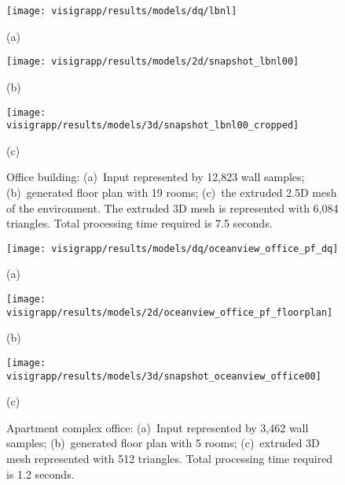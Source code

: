 \documentclass[12pt,onecolumn,oneside]{book}
\begin{document}
\begin{figure}
	\centering
	
	\begin{minipage}[b]{0.95\linewidth}
	\centerline{\texttt{[image: visigrapp/results/models/dq/lbnl]}}
	\centerline{(a)}
	\end{minipage}
	\hfill
	\begin{minipage}[b]{0.95\linewidth}
	\centerline{\texttt{[image: visigrapp/results/models/2d/snapshot\_lbnl00]}}
	\centerline{(b)}
	\end{minipage}
	\begin{minipage}[b]{0.95\linewidth}
	\centerline{\texttt{[image: visigrapp/results/models/3d/snapshot\_lbnl00\_cropped]}}
	\centerline{(c)}
	\end{minipage}

	\caption[Generated floor plan of an office building.]{Office building: (a)~Input represented by 12,823 wall samples; (b)~generated floor plan with 19 rooms; (c)~the extruded 2.5D mesh of the environment. The extruded 3D mesh is represented with 6,084 triangles.  Total processing time required is 7.5 seconds.}
	\label{fig:visigrapp_results_a}
\end{figure}

\begin{figure}[t]
	\centering
	
	\begin{minipage}[b]{0.50\linewidth}
	\centerline{\texttt{[image: visigrapp/results/models/dq/oceanview\_office\_pf\_dq]}}
	\centerline{(a)}
	\end{minipage}
	\hfill
	\begin{minipage}[b]{0.45\linewidth}
	\centerline{\texttt{[image: visigrapp/results/models/2d/oceanview\_office\_pf\_floorplan]}}
	\centerline{(b)}
	\end{minipage}
	\begin{minipage}[b]{0.95\linewidth}
	\centerline{\texttt{[image: visigrapp/results/models/3d/snapshot\_oceanview\_office00]}}
	\centerline{(c)}
	\end{minipage}

	\caption[Floor plan of an apartment complex office.]{Apartment complex office: (a)~Input represented by 3,462 wall samples; (b)~generated floor plan with 5 rooms; (c)~extruded 3D mesh represented with 512 triangles.  Total processing time required is 1.2 seconds.}
	\label{fig:visigrapp_results_d}
\end{figure}
\end{document}
